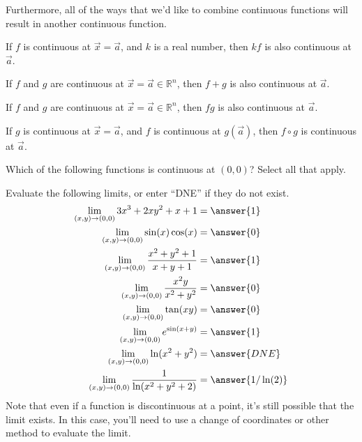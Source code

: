 \documentclass{ximera}
\begin{document}
Furthermore, all of the ways that we'd like to combine continuous functions will result in another continuous function.

\begin{theorem}
If $f$ is continuous at $\vec{x}=\vec{a}$, and $k$ is a real number, then $kf$ is also continuous at $\vec{a}$.

If $f$ and $g$ are continuous at $\vec{x}=\vec{a}\in\mathbb{R}^n$, then $f+g$ is also continuous at $\vec{a}$.

If $f$ and $g$ are continuous at $\vec{x}=\vec{a}\in\mathbb{R}^n$, then $fg$ is also continuous at $\vec{a}$.

If $g$ is continuous at $\vec{x}=\vec{a}$, and $f$ is continuous at $g(\vec{a})$, then $f\circ g$ is continuous at $\vec{a}$.
\end{theorem}

\begin{example}
Which of the following functions is continuous at $(0,0)$? Select all that apply.
\begin{selectAll}
\end{selectAll}
\end{example}

\begin{example}
Evaluate the following limits, or enter ``DNE'' if they do not exist.
\begin{align*}
\lim_{(x,y)\rightarrow(0,0)}3x^3+2xy^2+x+1& = \answer{1}\\
\lim_{(x,y)\rightarrow(0,0)} \sin(x)\cos(x) &= \answer{0}\\
\lim_{(x,y)\rightarrow(0,0)}\frac{x^2+y^2+1}{x+y+1} &= \answer{1}\\
\lim_{(x,y)\rightarrow(0,0)} \frac{x^2y}{x^2+y^2} &= \answer{0}\\
\lim_{(x,y)\rightarrow(0,0)}\tan(xy) &= \answer{0}\\
\lim_{(x,y)\rightarrow(0,0)}e^{\sin(x+y)} &= \answer{1}\\
\lim_{(x,y)\rightarrow(0,0)}\ln(x^2+y^2) &= \answer{DNE}\\
\lim_{(x,y)\rightarrow(0,0)}\frac{1}{\ln(x^2+y^2+2)} &= \answer{1/\ln(2)}
\end{align*}
Note that even if a function is discontinuous at a point, it's still possible that the limit exists. In this case, you'll need to use a change of coordinates or other method to evaluate the limit.
\end{example}
\end{document}
